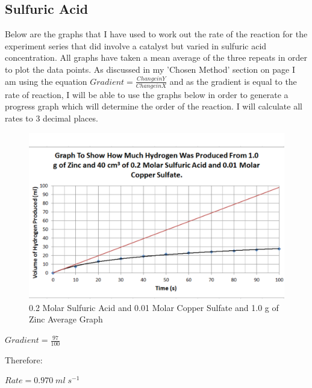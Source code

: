 	\subsection{Sulfuric Acid}

Below are the graphs that I have used to work out the rate of the reaction for the experiment series that did involve a catalyst but varied in sulfuric acid concentration. All graphs have taken a mean average of the three repeats in order to plot the data points. As discussed in my 'Chosen Method' section on page \pageref{Chosen Method} I am using the equation $Gradient = \frac{Change in Y}{Change in X}$ and as the gradient is equal to the rate of reaction, I will be able to use the graphs below in order to generate a progress graph which will determine the order of the reaction. I will calculate all rates to 3 decimal places.


\begin{figure}[H]
    \includegraphics[width=\textwidth]{./Analysis/Images/2Catalysed/02Molar.pdf}
    \caption{0.2 Molar Sulfuric Acid and 0.01 Molar Copper Sulfate and 1.0 g of Zinc Average Graph} \label{fig:02MolarSACSGradient}
\end{figure}

$Gradient = \frac{97}{100}$

Therefore:

$Rate = 0.970 \; ml \; s^{-1}$

